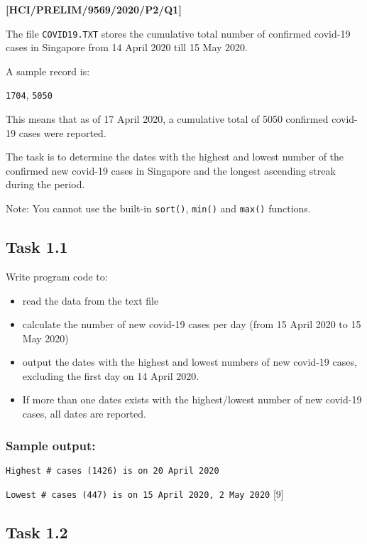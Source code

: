 \item \textbf{{[}HCI/PRELIM/9569/2020/P2/Q1{]} }

The file \texttt{COVID19.TXT} stores the cumulative total number of
confirmed covid-19 cases in Singapore from 14 April 2020 till 15 May
2020.

A sample record is: 

\texttt{1704}, \texttt{5050 }

This means that as of 17 April 2020, a cumulative total of 5050 confirmed
covid-19 cases were reported. 

The task is to determine the dates with the highest and lowest number
of the confirmed new covid-19 cases in Singapore and the longest ascending
streak during the period.

Note: You cannot use the built-in \texttt{sort()}, \texttt{min()}
and \texttt{max()} functions.

\subsection*{Task 1.1 }

Write program code to: 
\begin{itemize}
\item read the data from the text file 
\item calculate the number of new covid-19 cases per day (from 15 April
2020 to 15 May 2020) 
\item output the dates with the highest and lowest numbers of new covid-19
cases, excluding the first day on 14 April 2020. 
\item If more than one dates exists with the highest/lowest number of new
covid-19 cases, all dates are reported.
\end{itemize}

\subsubsection*{Sample output:}

\texttt{Highest \# cases (1426) is on 20 April 2020 }

\texttt{Lowest \# cases (447) is on 15 April 2020, 2 May 2020} \hfill{}{[}9{]}

\subsection*{Task 1.2 }

